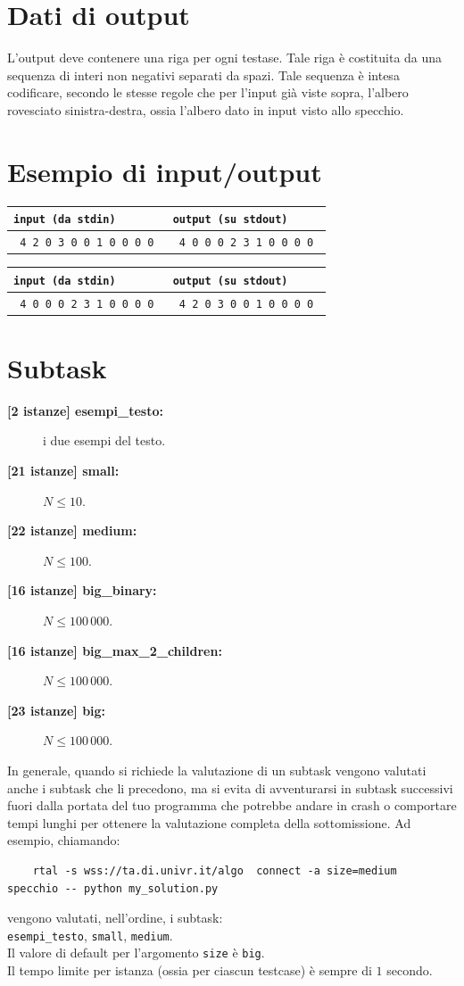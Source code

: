 \documentclass[a4paper,11pt]{article}
\newcommand{\file}[1]{\texttt{#1}}
\newcommand{\esempio}[2]{
\noindent\begin{minipage}{\textwidth}
\begin{tabular}{|p{11cm}|p{5cm}|}
	\hline
      \textbf{\file{input (da stdin)}} & \textbf{\file{output (su stdout)}}\\
	\hline
	\tt \small #1 &
	\tt \small #2 \\
	\hline
\end{tabular}
\end{minipage}
}
\begin{document}
\section*{Dati di output}

L'output deve contenere una riga per ogni testase. Tale riga è costituita da una sequenza di interi non negativi separati da spazi. Tale sequenza è intesa codificare, secondo le stesse regole che per l'input già viste sopra, l'albero rovesciato sinistra-destra, ossia l'albero dato in input visto allo specchio.

\section*{Esempio di input/output}
\esempio{
4 2 0 3 0 0 1 0 0 0 0
}{
4 0 0 0 2 3 1 0 0 0 0
}

\esempio{
4 0 0 0 2 3 1 0 0 0 0
}{
4 2 0 3 0 0 1 0 0 0 0
}


\section*{Subtask}
\begin{description}
\item[\textbf{\hspace{1ex}[2 istanze] esempi\_testo:}] i due esempi del testo.
\item [\textbf{[21 istanze] small:}] $N \le 10$.
\item [\textbf{[22 istanze] medium:}] $N \le 100$.
\item [\textbf{[16 istanze] big\_binary:}] $N \le 100\,000$.
\item [\textbf{[16 istanze] big\_max\_2\_children:}] $N \le 100\,000$.
\item [\textbf{[23 istanze] big:}] $N \le 100\,000$.
\end{description}

In generale, quando si richiede la valutazione di un subtask vengono valutati anche i subtask che li precedono, ma si evita di avventurarsi in subtask successivi  fuori dalla portata del tuo programma che potrebbe andare in crash o comportare tempi lunghi per ottenere la valutazione completa della sottomissione. Ad esempio, chiamando:

\begin{verbatim}
    rtal -s wss://ta.di.univr.it/algo  connect -a size=medium  specchio -- python my_solution.py
\end{verbatim}

\noindent
vengono valutati, nell'ordine, i subtask:\\

{\tt esempi\_testo}, {\tt small}, {\tt medium}.\\

\noindent
Il valore di default per l'argomento {\tt size} è {\tt big}.\\

\noindent
Il tempo limite per istanza (ossia per ciascun testcase) è sempre di $1$ secondo.
\end{document}

